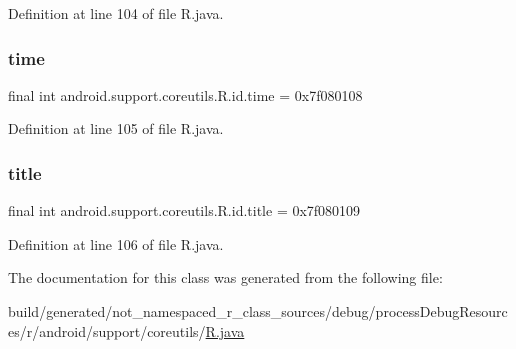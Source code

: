Definition at line 104 of file R.\+java.

\mbox{\label{classandroid_1_1support_1_1coreutils_1_1_r_1_1id_ad7a7e56ee49aaa67d17b3cb87cf684b2}} 
\subsubsection{\texorpdfstring{time}{time}}
{\footnotesize\ttfamily final int android.\+support.\+coreutils.\+R.\+id.\+time = 0x7f080108\hspace{0.3cm}{\ttfamily [static]}}



Definition at line 105 of file R.\+java.

\mbox{\label{classandroid_1_1support_1_1coreutils_1_1_r_1_1id_ab9de2d4e17927fd3cbb3594914b602ea}} 
\subsubsection{\texorpdfstring{title}{title}}
{\footnotesize\ttfamily final int android.\+support.\+coreutils.\+R.\+id.\+title = 0x7f080109\hspace{0.3cm}{\ttfamily [static]}}



Definition at line 106 of file R.\+java.



The documentation for this class was generated from the following file\+:\begin{DoxyCompactItemize}
\item 
build/generated/not\+\_\+namespaced\+\_\+r\+\_\+class\+\_\+sources/debug/process\+Debug\+Resources/r/android/support/coreutils/\mbox{\hyperlink{android_2support_2coreutils_2_r_8java}{R.\+java}}\end{DoxyCompactItemize}
